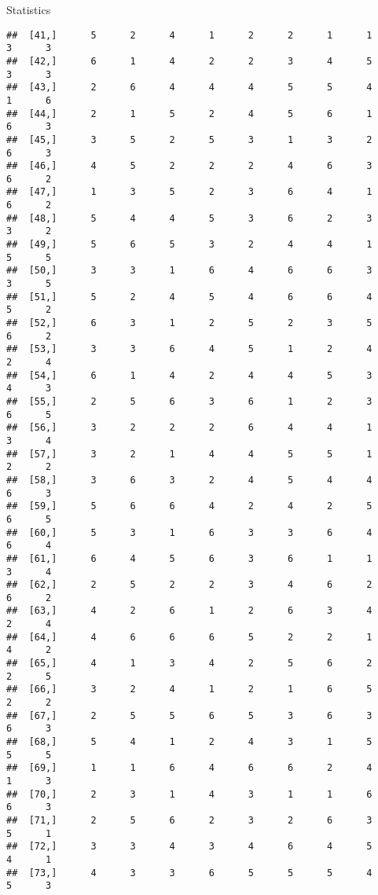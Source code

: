 \documentclass[
  ignorenonframetext,
]{beamer}
\begin{document}
\begin{frame}[fragile]{Statistics}
\begin{verbatim}
##  [41,]      5      2      4      1      2      2      1      1      3      3
##  [42,]      6      1      4      2      2      3      4      5      3      3
##  [43,]      2      6      4      4      4      5      5      4      1      6
##  [44,]      2      1      5      2      4      5      6      1      6      3
##  [45,]      3      5      2      5      3      1      3      2      6      3
##  [46,]      4      5      2      2      2      4      6      3      6      2
##  [47,]      1      3      5      2      3      6      4      1      6      2
##  [48,]      5      4      4      5      3      6      2      3      3      2
##  [49,]      5      6      5      3      2      4      4      1      5      5
##  [50,]      3      3      1      6      4      6      6      3      3      5
##  [51,]      5      2      4      5      4      6      6      4      5      2
##  [52,]      6      3      1      2      5      2      3      5      6      2
##  [53,]      3      3      6      4      5      1      2      4      2      4
##  [54,]      6      1      4      2      4      4      5      3      4      3
##  [55,]      2      5      6      3      6      1      2      3      6      5
##  [56,]      3      2      2      2      6      4      4      1      3      4
##  [57,]      3      2      1      4      4      5      5      1      2      2
##  [58,]      3      6      3      2      4      5      4      4      6      3
##  [59,]      5      6      6      4      2      4      2      5      6      5
##  [60,]      5      3      1      6      3      3      6      4      6      4
##  [61,]      6      4      5      6      3      6      1      1      3      4
##  [62,]      2      5      2      2      3      4      6      2      6      2
##  [63,]      4      2      6      1      2      6      3      4      2      4
##  [64,]      4      6      6      6      5      2      2      1      4      2
##  [65,]      4      1      3      4      2      5      6      2      2      5
##  [66,]      3      2      4      1      2      1      6      5      2      2
##  [67,]      2      5      5      6      5      3      6      3      6      3
##  [68,]      5      4      1      2      4      3      1      5      5      5
##  [69,]      1      1      6      4      6      6      2      4      1      3
##  [70,]      2      3      1      4      3      1      1      6      6      3
##  [71,]      2      5      6      2      3      2      6      3      5      1
##  [72,]      3      3      4      3      4      6      4      5      4      1
##  [73,]      4      3      3      6      5      5      5      4      5      3

\end{verbatim}
\end{frame}
\end{document}
